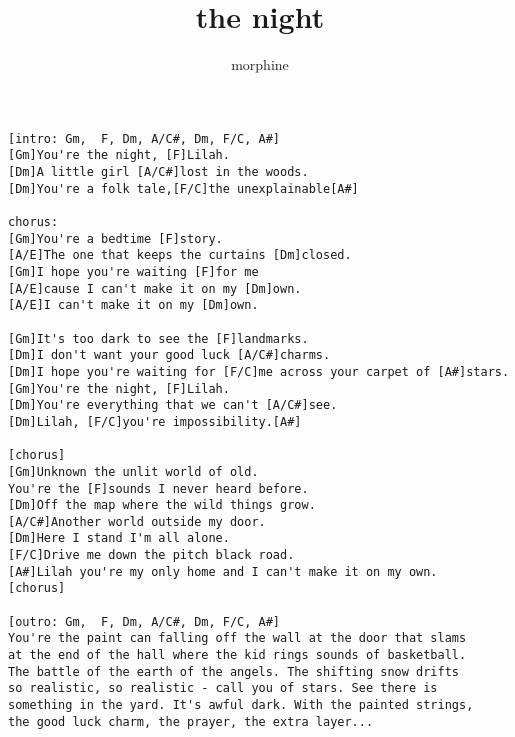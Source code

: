 \author{morphine}
\title{the night}
\maketitle
\begin{verbatim}
[intro: Gm,  F, Dm, A/C#, Dm, F/C, A#]
[Gm]You're the night, [F]Lilah.
[Dm]A little girl [A/C#]lost in the woods.
[Dm]You're a folk tale,[F/C]the unexplainable[A#]

chorus:
[Gm]You're a bedtime [F]story.
[A/E]The one that keeps the curtains [Dm]closed.
[Gm]I hope you're waiting [F]for me
[A/E]cause I can't make it on my [Dm]own.
[A/E]I can't make it on my [Dm]own.

[Gm]It's too dark to see the [F]landmarks.
[Dm]I don't want your good luck [A/C#]charms.
[Dm]I hope you're waiting for [F/C]me across your carpet of [A#]stars.
[Gm]You're the night, [F]Lilah.
[Dm]You're everything that we can't [A/C#]see.
[Dm]Lilah, [F/C]you're impossibility.[A#]

[chorus]
[Gm]Unknown the unlit world of old.
You're the [F]sounds I never heard before.
[Dm]Off the map where the wild things grow.
[A/C#]Another world outside my door.
[Dm]Here I stand I'm all alone.
[F/C]Drive me down the pitch black road.
[A#]Lilah you're my only home and I can't make it on my own.
[chorus]

[outro: Gm,  F, Dm, A/C#, Dm, F/C, A#]
You're the paint can falling off the wall at the door that slams
at the end of the hall where the kid rings sounds of basketball.
The battle of the earth of the angels. The shifting snow drifts
so realistic, so realistic - call you of stars. See there is
something in the yard. It's awful dark. With the painted strings,
the good luck charm, the prayer, the extra layer...
\end{verbatim}